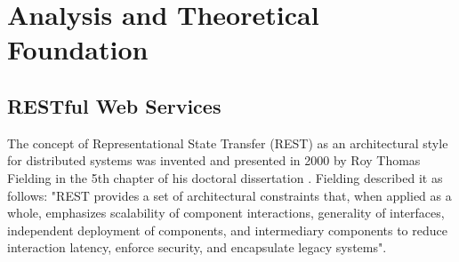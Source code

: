 \documentclass[12pt,a4paper,twoside]{report}
\begin{document}
\chapter{Analysis and Theoretical Foundation}

\section{RESTful Web Services}

The concept of Representational State Transfer (REST) as an architectural style for distributed systems was invented and presented in 2000 by Roy Thomas Fielding in the 5th chapter of his doctoral dissertation \cite{fielding_rest_definition}. Fielding described it as follows: "REST provides a set of architectural constraints that, when applied as a whole, emphasizes scalability of component interactions, generality of interfaces, independent deployment of components, and intermediary components to reduce interaction latency, enforce security, and encapsulate legacy systems".
\end{document}
